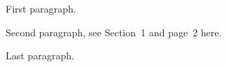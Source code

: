 \documentclass{article}
\begin{document}
\def\x{1}
First paragraph.

Second paragraph, see Section~1 and page~2 here.

\def\x{\x}
Last paragraph.
\end{document}
